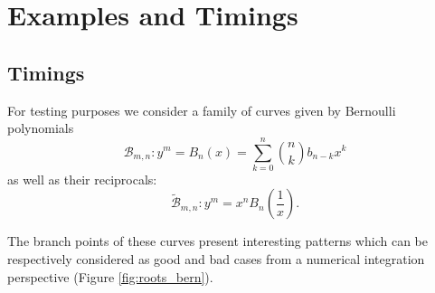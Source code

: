 \documentclass[main.tex]{subfiles}
\begin{document}
  \section{Examples and Timings}\label{sec:examples_timings}

  \subsection{Timings}
  \newcommand{\bern}{\mathcal{B}}
  \newcommand{\bernrev}{\widetilde{\bern}}

  For testing purposes we consider a family of curves given by Bernoulli polynomials
          \begin{equation}
              \bern_{m,n} : y^m = B_n(x) = \sum_{k=0}^n\binom nkb_{n-k}x^k
          \end{equation}
  as well as their reciprocals:
          \begin{equation}
              \bernrev_{m,n} : y^m = x^nB_n(\frac1x).
          \end{equation}

  The branch points of these curves present interesting patterns which can be respectively considered
  as good and bad cases from a numerical integration perspective (Figure \ref{fig:roots_bern}).
\end{document}
